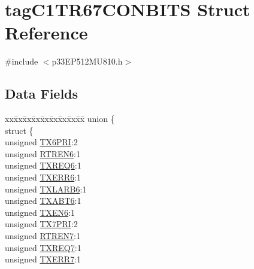 \hypertarget{structtag_c1_t_r67_c_o_n_b_i_t_s}{}\section{tag\+C1\+T\+R67\+C\+O\+N\+B\+I\+TS Struct Reference}
\label{structtag_c1_t_r67_c_o_n_b_i_t_s}


{\ttfamily \#include $<$p33\+E\+P512\+M\+U810.\+h$>$}

\subsection*{Data Fields}
\begin{DoxyCompactItemize}
\item 
\begin{tabbing}
xx\=xx\=xx\=xx\=xx\=xx\=xx\=xx\=xx\=\kill
union \{\\
\>struct \{\\
\>\>unsigned \hyperlink{structtag_c1_t_r67_c_o_n_b_i_t_s_acf0204ed7c7f2365b8630fad0bd6eb47}{TX6PRI}:2\\
\>\>unsigned \hyperlink{structtag_c1_t_r67_c_o_n_b_i_t_s_a555ea6fcaef37752e28a0a6d3f23a38f}{RTREN6}:1\\
\>\>unsigned \hyperlink{structtag_c1_t_r67_c_o_n_b_i_t_s_a2c5aa76d2ac34727d2c3b1242fde4597}{TXREQ6}:1\\
\>\>unsigned \hyperlink{structtag_c1_t_r67_c_o_n_b_i_t_s_a746ded28bbd2c1c42e066da844e4774d}{TXERR6}:1\\
\>\>unsigned \hyperlink{structtag_c1_t_r67_c_o_n_b_i_t_s_a29a390fc526dca0108230724c93377ba}{TXLARB6}:1\\
\>\>unsigned \hyperlink{structtag_c1_t_r67_c_o_n_b_i_t_s_a37dcf845d3570c5a496ee239ed4ba635}{TXABT6}:1\\
\>\>unsigned \hyperlink{structtag_c1_t_r67_c_o_n_b_i_t_s_ae9e23626a2fc83756bd209c1222e8f83}{TXEN6}:1\\
\>\>unsigned \hyperlink{structtag_c1_t_r67_c_o_n_b_i_t_s_a24fbd8b8aa9cf8b109b5ac2a2d602d35}{TX7PRI}:2\\
\>\>unsigned \hyperlink{structtag_c1_t_r67_c_o_n_b_i_t_s_a5f2b9fb0769e595dcddbf1f6ebe55592}{RTREN7}:1\\
\>\>unsigned \hyperlink{structtag_c1_t_r67_c_o_n_b_i_t_s_a787fc1af7ad34091400347d5ff70bd22}{TXREQ7}:1\\
\>\>unsigned \hyperlink{structtag_c1_t_r67_c_o_n_b_i_t_s_a238a79af6c23622b547fe5ff3eeca61f}{TXERR7}:1\\

\end{tabbing}
\end{DoxyCompactItemize}
